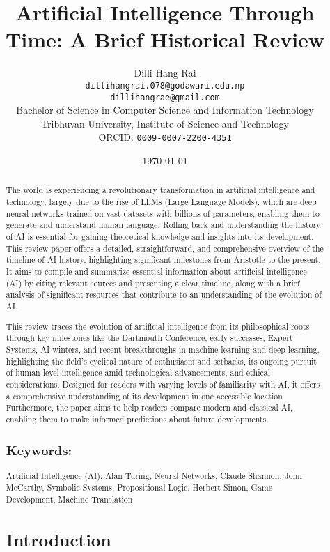 \documentclass[12pt]{article}
\title{Artificial Intelligence Through Time: A Brief Historical Review}
\author{
    Dilli Hang Rai \\
    \texttt{dillihangrai.078@godawari.edu.np} \\
    \texttt{dillihangrae@gmail.com} \\
    Bachelor of Science in Computer Science and Information Technology \\
    Tribhuvan University, Institute of Science and Technology \\
    ORCID: \texttt{0009-0007-2200-4351}
}
\date{\today}
\begin{document}
\maketitle

\begin{abstract}
{

The world is experiencing a revolutionary transformation in artificial intelligence and technology, largely due to the rise of LLMs (Large Language Models), which are deep neural networks trained on vast datasets with billions of parameters, enabling them to generate and understand human language. Rolling back and understanding the history of AI is essential for gaining theoretical knowledge and insights into its development. This review paper offers a detailed, straightforward, and comprehensive overview of the timeline of AI history, highlighting significant milestones from Aristotle to the present. It aims to compile and summarize essential information about artificial intelligence (AI) by citing relevant sources and presenting a clear timeline, along with a brief analysis of significant resources that contribute to an understanding of the evolution of AI.

This review traces the evolution of artificial intelligence from its philosophical roots through key milestones like the Dartmouth Conference, early successes, Expert Systems, AI winters, and recent breakthroughs in machine learning and deep learning, highlighting the field's cyclical nature of enthusiasm and setbacks, its ongoing pursuit of human-level intelligence amid technological advancements, and ethical considerations. Designed for readers with varying levels of familiarity with AI, it offers a comprehensive understanding of its development in one accessible location. Furthermore, the paper aims to help readers compare modern and classical AI, enabling them to make informed predictions about future developments.

}
\subsection*{Keywords:} Artificial Intelligence (AI),
Alan Turing,
Neural Networks,
Claude Shannon,
John McCarthy,
Symbolic Systems,
Propositional Logic,
Herbert Simon,
Game Development,
Machine Translation

\section{Introduction}


\end{abstract}
\end{document}
